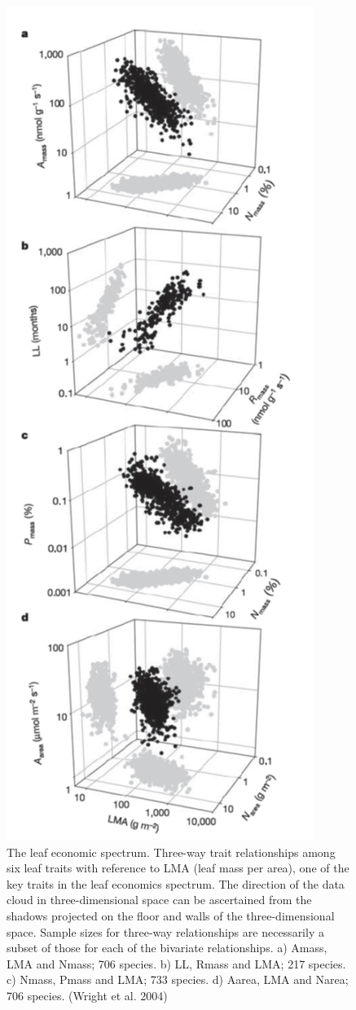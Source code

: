 \documentclass[12pt,oneside]{book}
\begin{document}
\begin{figure}

{\centering \includegraphics[width=0.6\linewidth]{figures/chap7/f75_LES_wright} 

}

\caption{The leaf economic spectrum. Three-way trait relationships among six leaf traits with reference to LMA (leaf mass per area), one of the key traits in the leaf economics spectrum. The direction of the data cloud in three-dimensional space can be ascertained from the shadows projected on the floor and walls of the three-dimensional space. Sample sizes for three-way relationships are necessarily a subset of those for each of the bivariate relationships. a) Amass, LMA and Nmass; 706 species. b) LL, Rmass and LMA; 217 species. c) Nmass, Pmass and LMA; 733 species. d) Aarea, LMA and Narea; 706 species. (Wright et al. 2004)}\label{fig:f75}
\end{figure}
\end{document}
